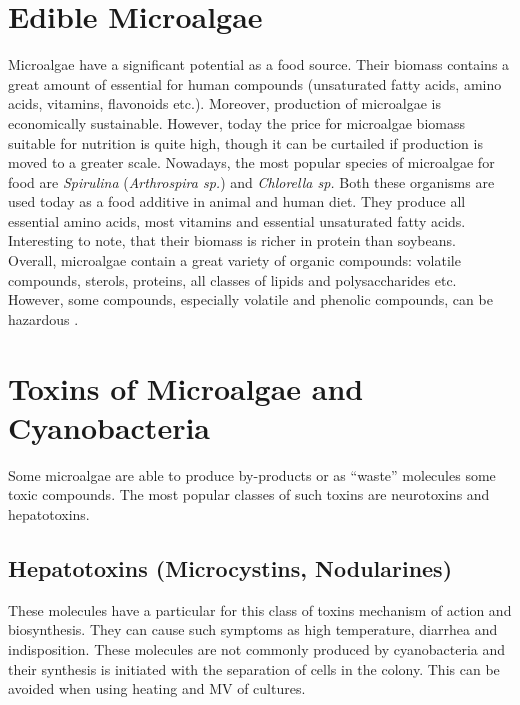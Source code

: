 \section{Edible Microalgae}
Microalgae have a significant potential as a food source. Their biomass contains a great amount of essential for human compounds (unsaturated fatty acids, amino acids, vitamins, flavonoids etc.). Moreover, production of microalgae is economically sustainable. However, today the price for microalgae biomass suitable for nutrition is quite high, though it can be curtailed if production is moved to a greater scale. 
Nowadays, the most popular species of microalgae for food are \textit{Spirulina} (\textit{Arthrospira sp.}) and \textit{Chlorella sp.} Both these organisms are used today as a food additive in animal and human diet. They produce all essential amino acids, most vitamins and essential unsaturated fatty acids. Interesting to note, that their biomass is richer in protein than soybeans. \\
Overall, microalgae contain a great variety of organic compounds: volatile compounds, sterols, proteins, all classes of lipids and polysaccharides etc. However, some compounds, especially volatile and phenolic compounds, can be hazardous \parencite{Andrade2018} \parencite{Torres-Tiji2020}.

\section{Toxins of Microalgae and Cyanobacteria}
Some microalgae are able to produce by-products or as “waste” molecules some toxic compounds. The most popular classes of such toxins are neurotoxins and hepatotoxins. 

\subsection{Hepatotoxins (Microcystins, Nodularines)}
These molecules have a particular for this class of toxins mechanism of action and biosynthesis. They can cause such symptoms as high temperature, diarrhea and indisposition. These molecules are not commonly produced by cyanobacteria and their synthesis is initiated with the separation of cells in the colony. This can be avoided when using heating and MV of cultures.

